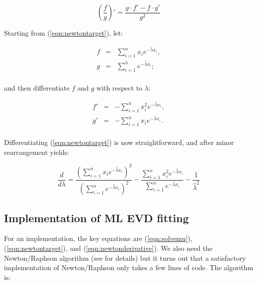 \[
\left( \frac{f}{g} \right)' = \frac{g \cdot f' - f \cdot g'}{g^2}
\]

Starting from (\ref{eqn:newtontarget}), let:

\begin{eqnarray*}
f & = & \sum_{i=1}^{n} x_i e^{-\hat{\lambda} x_i}, \\
g & = & \sum_{i=1}^{n} e^{-\hat{\lambda} x_i}; \\
\end{eqnarray*}

and then differentiate $f$ and $g$ with respect to $\lambda$:

\begin{eqnarray*}
f' & = & - \sum_{i=1}^{n} x_i^2 e^{-\hat{\lambda} x_i}, \\
g' & = & - \sum_{i=1}^{n} x_i e^{-\hat{\lambda} x_i}. \\
\end{eqnarray*}

Differentiating (\ref{eqn:newtontarget}) is now straightforward,
and after minor rearrangement yields:

\begin{equation}
\frac{d}{d\lambda} = 
\frac{\left( \sum_{i=1}^{n} x_i e^{-\hat{\lambda} x_i} \right)^2 } 
     {\left( \sum_{i=1}^{n} e^{-\hat{\lambda} x_i}     \right)^2 }
-
\frac{\sum_{i=1}^{n} x_i^2 e^{-\hat{\lambda} x_i}}
     {\sum_{i=1}^{n} e^{-\hat{\lambda} x_i}}
-
\frac{1}{\hat{\lambda}^2}
\label{eqn:newtonderivative}
\end{equation}

\subsection{Implementation of ML EVD fitting}

For an implementation, the key equations are (\ref{eqn:solvemu}),
(\ref{eqn:newtontarget}), and (\ref{eqn:newtonderivative}). We also
need the Newton/Raphson algorithm (see \cite{Press88} for details) but
it turns out that a satisfactory implementation of Newton/Raphson only
takes a few lines of code. The algorithm is:

